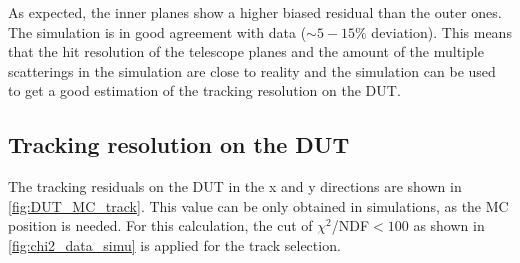 As expected, the inner planes show a higher biased residual than the
outer ones. The simulation is in good agreement with data
($\sim5-15\%$ deviation). This means that the hit resolution of the
telescope planes and the amount of the multiple scatterings in the
simulation are close to reality and the simulation can be used to get
a good estimation of the tracking resolution on the DUT.




\subsection{Tracking resolution on the DUT}
The tracking residuals on the DUT in the x and y directions are shown
in \cref{fig:DUT_MC_track}. This value can be only obtained in
simulations, as the MC position is needed. For this calculation, the
cut of $\chi^2$/NDF$<100$ as shown in \cref{fig:chi2_data_simu} is
applied for the track selection.

